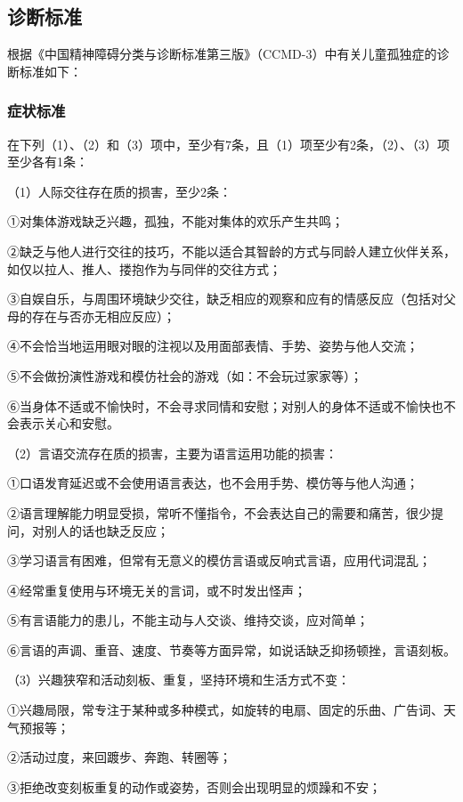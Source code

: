 \subsection{诊断标准}

根据《中国精神障碍分类与诊断标准第三版》（CCMD-3）中有关儿童孤独症的诊断标准如下：

\subsubsection{症状标准}

在下列（1）、（2）和（3）项中，至少有7条，且（1）项至少有2条，（2）、（3）项至少各有1条：

（1）人际交往存在质的损害，至少2条：

①对集体游戏缺乏兴趣，孤独，不能对集体的欢乐产生共鸣；

②缺乏与他人进行交往的技巧，不能以适合其智龄的方式与同龄人建立伙伴关系，如仅以拉人、推人、搂抱作为与同伴的交往方式；

③自娱自乐，与周围环境缺少交往，缺乏相应的观察和应有的情感反应（包括对父母的存在与否亦无相应反应）；

④不会恰当地运用眼对眼的注视以及用面部表情、手势、姿势与他人交流；

⑤不会做扮演性游戏和模仿社会的游戏（如：不会玩过家家等）；

⑥当身体不适或不愉快时，不会寻求同情和安慰；对别人的身体不适或不愉快也不会表示关心和安慰。

（2）言语交流存在质的损害，主要为语言运用功能的损害：

①口语发育延迟或不会使用语言表达，也不会用手势、模仿等与他人沟通；

②语言理解能力明显受损，常听不懂指令，不会表达自己的需要和痛苦，很少提问，对别人的话也缺乏反应；

③学习语言有困难，但常有无意义的模仿言语或反响式言语，应用代词混乱；

④经常重复使用与环境无关的言词，或不时发出怪声；

⑤有言语能力的患儿，不能主动与人交谈、维持交谈，应对简单；

⑥言语的声调、重音、速度、节奏等方面异常，如说话缺乏抑扬顿挫，言语刻板。

（3）兴趣狭窄和活动刻板、重复，坚持环境和生活方式不变：

①兴趣局限，常专注于某种或多种模式，如旋转的电扇、固定的乐曲、广告词、天气预报等；

②活动过度，来回踱步、奔跑、转圈等；

③拒绝改变刻板重复的动作或姿势，否则会出现明显的烦躁和不安；

